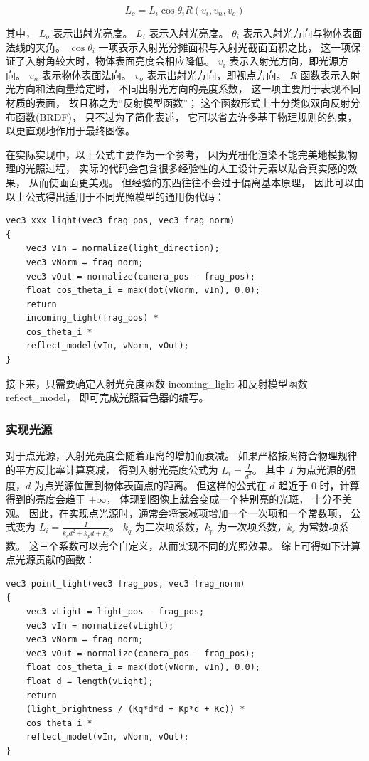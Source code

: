 \documentclass[fontset=windows]{ctexart}
\begin{document}
$$L_o=L_i\cos\theta_iR\left(v_i, v_n, v_o\right)$$

其中，
$L_o$ 表示出射光亮度。
$L_i$ 表示入射光亮度。
$\theta_i$ 表示入射光方向与物体表面法线的夹角。
$\cos\theta_i$ 一项表示入射光分摊面积与入射光截面面积之比，
这一项保证了入射角较大时，物体表面亮度会相应降低。
$v_i$ 表示入射光方向，即光源方向。
$v_n$ 表示物体表面法向。
$v_o$ 表示出射光方向，即视点方向。
$R$ 函数表示入射光方向和法向量给定时，
不同出射光方向的亮度系数，
这一项主要用于表现不同材质的表面，
故且称之为“反射模型函数”；
这个函数形式上十分类似双向反射分布函数(BRDF)，
只不过为了简化表述，
它可以省去许多基于物理规则的约束，
以更直观地作用于最终图像。

在实际实现中，以上公式主要作为一个参考，
因为光栅化渲染不能完美地模拟物理的光照过程，
实际的代码会包含很多经验性的人工设计元素以贴合真实感的效果，
从而使画面更美观。
但经验的东西往往不会过于偏离基本原理，
因此可以由以上公式得出适用于不同光照模型的通用伪代码：

\begin{lstlisting}
vec3 xxx_light(vec3 frag_pos, vec3 frag_norm)
{
    vec3 vIn = normalize(light_direction);
    vec3 vNorm = frag_norm; 
    vec3 vOut = normalize(camera_pos - frag_pos);
    float cos_theta_i = max(dot(vNorm, vIn), 0.0);
    return 
    incoming_light(frag_pos) * 
    cos_theta_i * 
    reflect_model(vIn, vNorm, vOut);
}
\end{lstlisting}

接下来，只需要确定入射光亮度函数 incoming\_light 
和反射模型函数 reflect\_model，
即可完成光照着色器的编写。

\subsubsection{实现光源}

对于点光源，入射光亮度会随着距离的增加而衰减。
如果严格按照符合物理规律的平方反比率计算衰减，
得到入射光亮度公式为 $L_i=\frac{I}{d^2}$。
其中 $I$ 为点光源的强度，$d$ 为点光源位置到物体表面点的距离。
但这样的公式在 $d$ 趋近于 $0$ 时，计算得到的亮度会趋于 $+\infty$，
体现到图像上就会变成一个特别亮的光斑，
十分不美观。
因此，在实现点光源时，通常会将衰减项增加一个一次项和一个常数项，
公式变为 $L_i=\frac{I}{k_qd^2 + k_pd + k_c}$。
$k_q$ 为二次项系数，$k_p$ 为一次项系数，$k_c$ 为常数项系数。
这三个系数可以完全自定义，从而实现不同的光照效果。
综上可得如下计算点光源贡献的函数：
\begin{lstlisting}
vec3 point_light(vec3 frag_pos, vec3 frag_norm)
{
    vec3 vLight = light_pos - frag_pos;
    vec3 vIn = normalize(vLight);
    vec3 vNorm = frag_norm; 
    vec3 vOut = normalize(camera_pos - frag_pos);
    float cos_theta_i = max(dot(vNorm, vIn), 0.0);
    float d = length(vLight);
    return 
    (light_brightness / (Kq*d*d + Kp*d + Kc)) * 
    cos_theta_i * 
    reflect_model(vIn, vNorm, vOut);
}
\end{lstlisting}
\end{document}
